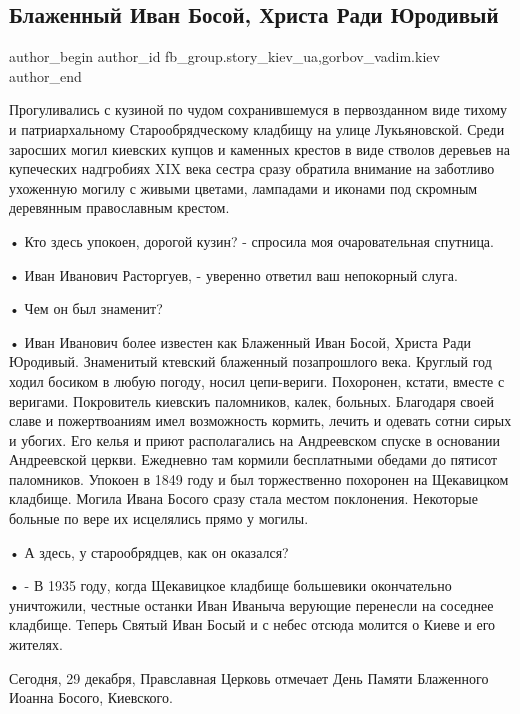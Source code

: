  
 
 
 
 
 
\subsection{Блаженный Иван Босой, Христа Ради Юродивый}
\label{sec:29_12_2021.fb.fb_group.story_kiev_ua.1.ivan_bosoj}
 
\ifcmt
 author_begin
   author_id fb_group.story_kiev_ua,gorbov_vadim.kiev
 author_end
\fi

Прогуливались  с кузиной по чудом сохранившемуся в первозданном виде тихому и
патриархальному Старообрядческому кладбищу на улице Лукьяновской. Среди
заросших могил киевских купцов и каменных крестов в виде стволов деревьев на
купеческих надгробиях  XIX века сестра сразу  обратила внимание на заботливо
ухоженную могилу с живыми цветами, лампадами и иконами под скромным деревянным
православным крестом.

• Кто здесь упокоен, дорогой кузин? - спросила моя очаровательная спутница.

• Иван Иванович Расторгуев, - уверенно ответил ваш непокорный слуга.

• Чем он был знаменит?

• Иван Иванович более известен как Блаженный Иван Босой, Христа Ради Юродивый.
Знаменитый ктевский блаженный позапрошлого века. Круглый год ходил босиком в
любую погоду, носил цепи-вериги. Похоронен, кстати,  вместе  с веригами.
Покровитель киевскиъ паломников, калек, больных. Благодаря своей славе и
пожертвоаниям имел возможность кормить, лечить и одевать сотни сирых и убогих.
Его келья и приют располагались на Андреевском спуске в основании Андреевской
церкви. Ежедневно там кормили бесплатными обедами до пятисот паломников.
Упокоен в 1849 году и был торжественно похоронен на Щекавицком кладбище. Могила
Ивана Босого сразу стала местом поклонения. Некоторые больные по вере их
исцелялись прямо у могилы.

• А здесь, у старообрядцев,  как он оказался?

• - В 1935 году, когда Щекавицкое кладбище большевики окончательно уничтожили,
честные останки  Иван Иваныча верующие перенесли на соседнее кладбище. Теперь
Святый Иван Босый и с небес отсюда молится о Киеве и его жителях.

Сегодня, 29 декабря, Правславная Церковь отмечает День Памяти Блаженного
Иоанна Босого, Киевского.
